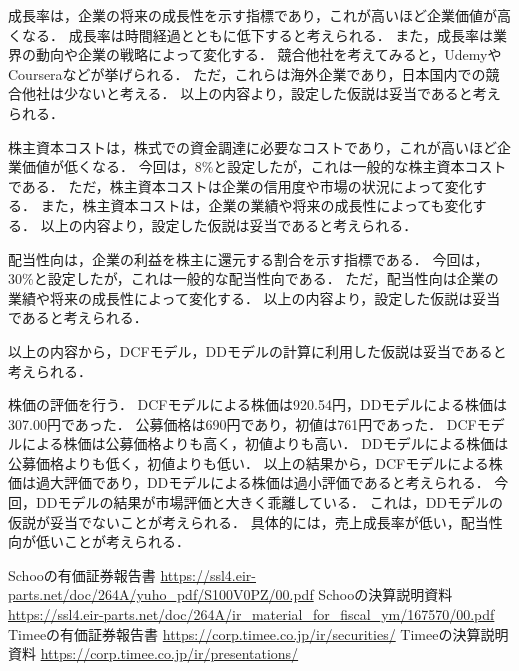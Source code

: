 \documentclass[a4paper]{ltjsarticle}
\begin{document}
成長率は，企業の将来の成長性を示す指標であり，これが高いほど企業価値が高くなる．
成長率は時間経過とともに低下すると考えられる．
また，成長率は業界の動向や企業の戦略によって変化する．
競合他社を考えてみると，UdemyやCourseraなどが挙げられる．
ただ，これらは海外企業であり，日本国内での競合他社は少ないと考える．
以上の内容より，設定した仮説は妥当であると考えられる．

株主資本コストは，株式での資金調達に必要なコストであり，これが高いほど企業価値が低くなる．
今回は，8\%と設定したが，これは一般的な株主資本コストである．
ただ，株主資本コストは企業の信用度や市場の状況によって変化する．
また，株主資本コストは，企業の業績や将来の成長性によっても変化する．
以上の内容より，設定した仮説は妥当であると考えられる．

配当性向は，企業の利益を株主に還元する割合を示す指標である．
今回は，30\%と設定したが，これは一般的な配当性向である．
ただ，配当性向は企業の業績や将来の成長性によって変化する．
以上の内容より，設定した仮説は妥当であると考えられる．

以上の内容から，DCFモデル，DDモデルの計算に利用した仮説は妥当であると考えられる．

株価の評価を行う．
DCFモデルによる株価は920.54円，DDモデルによる株価は307.00円であった．
公募価格は690円であり，初値は761円であった．
DCFモデルによる株価は公募価格よりも高く，初値よりも高い．
DDモデルによる株価は公募価格よりも低く，初値よりも低い．
以上の結果から，DCFモデルによる株価は過大評価であり，DDモデルによる株価は過小評価であると考えられる．
今回，DDモデルの結果が市場評価と大きく乖離している．
これは，DDモデルの仮説が妥当でないことが考えられる．
具体的には，売上成長率が低い，配当性向が低いことが考えられる．

\begin{thebibliography}{9}
 Schooの有価証券報告書 \url{https://ssl4.eir-parts.net/doc/264A/yuho_pdf/S100V0PZ/00.pdf}
 Schooの決算説明資料 \url{https://ssl4.eir-parts.net/doc/264A/ir_material_for_fiscal_ym/167570/00.pdf}
 Timeeの有価証券報告書 \url{https://corp.timee.co.jp/ir/securities/}
 Timeeの決算説明資料 \url{https://corp.timee.co.jp/ir/presentations/}
\end{thebibliography}
\end{document}
